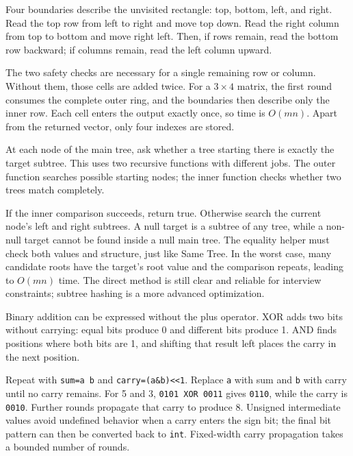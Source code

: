 \expandafter\def\csname sourcewalkthrough@59\endcsname{%
Four boundaries describe the unvisited rectangle: top, bottom, left, and
right. Read the top row from left to right and move top down. Read the right
column from top to bottom and move right left. Then, if rows remain, read the
bottom row backward; if columns remain, read the left column upward.

The two safety checks are necessary for a single remaining row or column.
Without them, those cells are added twice. For a \(3\times4\) matrix, the
first round consumes the complete outer ring, and the boundaries then describe
only the inner row. Each cell enters the output exactly once, so time is
\(O(mn)\). Apart from the returned vector, only four indexes are stored.}

\expandafter\def\csname sourcewalkthrough@60\endcsname{%
At each node of the main tree, ask whether a tree starting there is exactly
the target subtree. This uses two recursive functions with different jobs.
The outer function searches possible starting nodes; the inner function checks
whether two trees match completely.

If the inner comparison succeeds, return true. Otherwise search the current
node's left and right subtrees. A null target is a subtree of any tree, while
a non-null target cannot be found inside a null main tree. The equality helper
must check both values and structure, just like Same Tree. In the worst case,
many candidate roots have the target's root value and the comparison repeats,
leading to \(O(mn)\) time. The direct method is still clear and reliable for
interview constraints; subtree hashing is a more advanced optimization.}

\expandafter\def\csname sourcewalkthrough@61\endcsname{%
Binary addition can be expressed without the plus operator. XOR adds two bits
without carrying: equal bits produce 0 and different bits produce 1. AND finds
positions where both bits are 1, and shifting that result left places the
carry in the next position.

Repeat with \texttt{sum=a b} and \texttt{carry=(a\&b)<<1}. Replace \texttt{a}
with sum and \texttt{b} with carry until no carry remains. For 5 and 3,
\texttt{0101 XOR 0011} gives \texttt{0110}, while the carry is
\texttt{0010}. Further rounds propagate that carry to produce 8. Unsigned
intermediate values avoid undefined behavior when a carry enters the sign bit;
the final bit pattern can then be converted back to \texttt{int}. Fixed-width
carry propagation takes a bounded number of rounds.}

